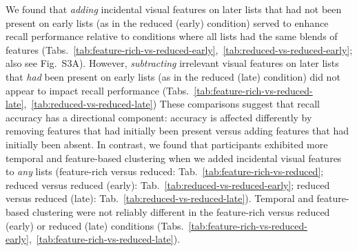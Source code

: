 \documentclass[11pt]{article}
\newcommand{\accuracyByList}{S3}
\newcommand{\abbreviations}{S1}
\begin{document}
\begin{table}[tp]
\centering
\tiny


\caption{\textbf{Comparing memory in the feature-rich versus reduced (late)
conditions (all lists).} The $t$-tests reported in the table were carried out
across-participants, and reflect data aggregated across all lists from each
participant. Abbreviations used in this table are defined in
Table~\abbreviations.}

\label{tab:feature-rich-vs-reduced-late}
\end{table}

\begin{table}[tp]
\centering
\tiny


\caption{\textbf{Comparing memory in the reduced versus reduced (late)
conditions (all lists).} The $t$-tests reported in the table were carried out
across-participants, and reflect data aggregated across all lists from each
participant. Abbreviations used in this table are defined in
Table~\abbreviations.}

\label{tab:reduced-vs-reduced-late}
\end{table}

We found that \textit{adding} incidental visual features on later lists that
had not been present on early lists (as in the reduced (early) condition)
served to enhance recall performance relative to conditions where all lists had
the same blends of features
(Tabs.~\ref{tab:feature-rich-vs-reduced-early},~\ref{tab:reduced-vs-reduced-early};
also see Fig.~\accuracyByList A). However, \textit{subtracting} irrelevant
visual features on later lists that \textit{had} been present on early lists
(as in the reduced (late) condition) did not appear to impact recall
performance
(Tabs.~\ref{tab:feature-rich-vs-reduced-late},~\ref{tab:reduced-vs-reduced-late})
These comparisons suggest that recall accuracy has a directional component:
accuracy is affected differently by removing features that had initially been
present versus adding features that had initially been absent. In contrast, we
found that participants exhibited more temporal and feature-based clustering
when we added incidental visual features to \textit{any} lists (feature-rich
versus reduced: Tab.~\ref{tab:feature-rich-vs-reduced}; reduced versus reduced
(early): Tab.~\ref{tab:reduced-vs-reduced-early}; reduced versus reduced
(late): Tab.~\ref{tab:reduced-vs-reduced-late}). Temporal and feature-based
clustering were not reliably different in the feature-rich versus reduced
(early) or reduced (late) conditions
(Tabs.~\ref{tab:feature-rich-vs-reduced-early},~\ref{tab:feature-rich-vs-reduced-late}).
\end{document}
